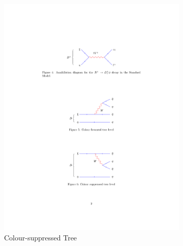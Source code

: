 \begin{figure}[!h]
\begin{subfigure}[b]{0.32\textwidth}
        \includegraphics[width=1.0\textwidth]{figs/Theory/TreeSup.pdf}
        \caption{Colour-suppressed Tree}
        \label{fig:theory_colour_sup}
    \end{subfigure}
    \begin{subfigure}[b]{0.32\textwidth}
        \centering

\end{subfigure}
\end{figure}
